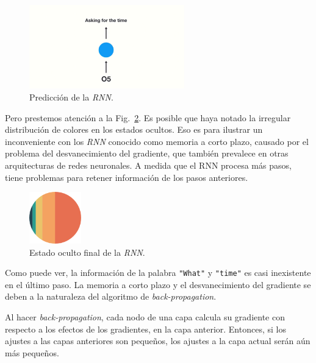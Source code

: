 \documentclass[a4paper,12pt]{article}
\begin{document}
\begin{figure}[H]
	\begin{center}				
		\includegraphics[width=0.6\textwidth]{vanishing2.png}
		\caption{Predicción de la \textit{RNN}.\citep{phi:rnn}}
		\label{fig:rnnvanishing2}
	\end{center}
\end{figure}

Pero prestemos atención a la Fig.~\ref{fig:rnnvanishing3}. Es posible que haya notado la irregular distribución de colores en los estados ocultos. Eso es para ilustrar un inconveniente con los \textit{RNN} conocido como memoria a corto plazo, causado por el problema del desvanecimiento del gradiente, que también prevalece en otras arquitecturas de redes neuronales. A medida que el RNN procesa más pasos, tiene problemas para retener información de los pasos anteriores.

\begin{figure}[H]
	\begin{center}				
		\includegraphics[width=0.2\textwidth]{vanishin3.png}
		\caption{Estado oculto final de la \textit{RNN}.\citep{phi:rnn}}
		\label{fig:rnnvanishing3}
	\end{center}
\end{figure}

Como puede ver, la información de la palabra \texttt{"What"} y \texttt{"time"} es casi inexistente en el último paso. La memoria a corto plazo y el desvanecimiento del gradiente se deben a la naturaleza del algoritmo de \textit{back-propagation}.

Al hacer \textit{back-propagation}, cada nodo de una capa calcula su gradiente con respecto a los efectos de los gradientes, en la capa anterior. Entonces, si los ajustes a las capas anteriores son pequeños, los ajustes a la capa actual serán aún más pequeños. 
\end{document}
